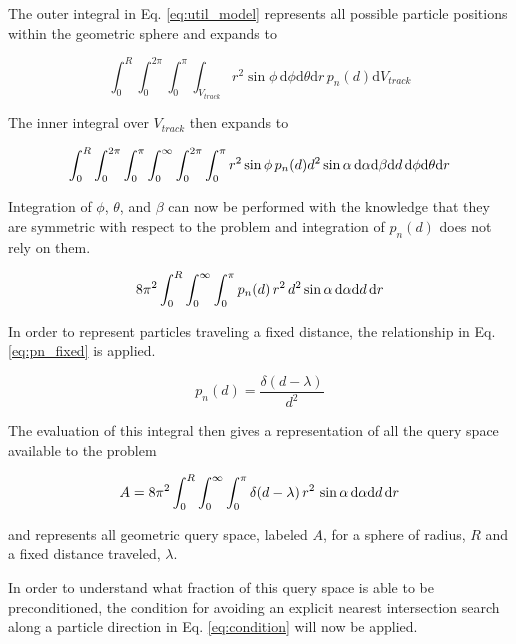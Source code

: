The outer integral in Eq. \ref{eq:util_model} represents all possible particle positions within the
geometric sphere and expands to

\begin{equation}
\int_{0}^{R}\int_{0}^{2\pi}\int_{0}^{\pi}\int_{V_{track}} r^2\sin{\phi} \, \mathrm{d}\phi
\mathrm{d}\theta \mathrm{d}r \,  p_n(d) \mathrm{d}V_{track}
\end{equation}

The inner integral over $V_{track}$ then expands to

\begin{equation}
\small \int_{0}^{R}\int_{0}^{2\pi}\int_{0}^{\pi}\int_{0}^{\infty}\int_{0}^{2\pi}\int_{0}^{\pi}
r^2\sin{\phi} \, p_n(d) d^2 \sin{\alpha} \, \mathrm{d}\alpha \mathrm{d}\beta \mathrm{d}d \, \mathrm{d}\phi
\mathrm{d}\theta \mathrm{d}r
\end{equation}

Integration of $\phi$, $\theta$, and $\beta$ can now be performed with
the knowledge that they are symmetric with respect to the problem and
integration of $p_n(d)$ does not rely on them.

\begin{equation}
\small 8\pi^2  \int_{0}^{R}\int_{0}^{\infty}\int_{0}^{\pi} p_n(d) \,
r^2 \, d^2 \sin{\alpha} \, \mathrm{d}\alpha \mathrm{d}d \, \mathrm{d}r
\end{equation}

In order to represent particles traveling a fixed distance, the relationship in Eq. \ref{eq:pn_fixed}
is applied.

\begin{equation}
  \label{eq:pn_fixed}
  p_n(d) = \frac{\delta(d-\lambda)}{d^{2}}
\end{equation}

The evaluation of this integral then gives a representation of all the query
space available to the problem

\begin{equation}
  \label{eq:A_fixed}
\small A = 8\pi^2  \int_{0}^{R}\int_{0}^{\infty}\int_{0}^{\pi} \delta(d-\lambda) \,
r^2 \, \sin{\alpha} \, \mathrm{d}\alpha \mathrm{d}d \, \mathrm{d}r
\end{equation}

and represents all geometric query space, labeled $A$, for a sphere of radius,
$R$ and a fixed distance traveled, $\lambda$.

In order to understand what fraction of this query space is able to be
preconditioned, the condition for avoiding an explicit nearest intersection
search along a particle direction in Eq. \ref{eq:condition} will now be
applied.

